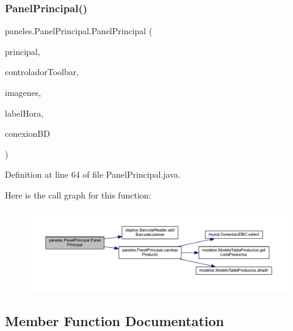 \subsubsection{\texorpdfstring{Panel\+Principal()}{PanelPrincipal()}}
{\footnotesize\ttfamily paneles.\+Panel\+Principal.\+Panel\+Principal (\begin{DoxyParamCaption}\item[{\mbox{\hyperlink{classvistas_1_1_principal}{Principal}}}]{principal,  }\item[{\mbox{\hyperlink{classcontroladores_1_1_controlador_toolbar}{Controlador\+Toolbar}}}]{controlador\+Toolbar,  }\item[{\mbox{\hyperlink{classimagenes_1_1_imagenes}{Imagenes}}}]{imagenes,  }\item[{J\+Label}]{label\+Hora,  }\item[{\mbox{\hyperlink{classmysql_1_1_conexion_j_d_b_c}{Conexion\+J\+D\+BC}}}]{conexion\+BD }\end{DoxyParamCaption})}



Definition at line 64 of file Panel\+Principal.\+java.

Here is the call graph for this function\+:\nopagebreak
\begin{figure}[H]
\begin{center}
\leavevmode
\includegraphics[width=350pt]{classpaneles_1_1_panel_principal_a8f8bc1a008744e424eec12eae5e0a745_cgraph}
\end{center}
\end{figure}


\subsection{Member Function Documentation}
\mbox{\label{classpaneles_1_1_panel_principal_ad46c27384163d0757eadfe86cf72ee70}} 
